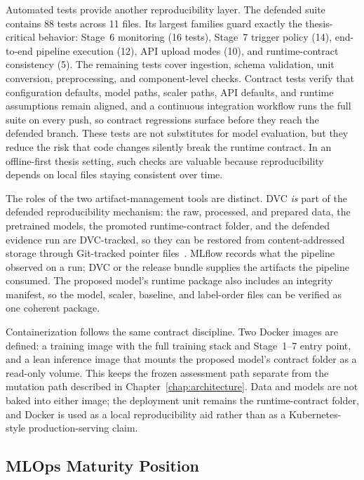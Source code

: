 Automated tests provide another reproducibility layer. The defended suite contains 88 tests across 11 files. Its largest families guard exactly the thesis-critical behavior: Stage~6 monitoring (16 tests), Stage~7 trigger policy (14), end-to-end pipeline execution (12), API upload modes (10), and runtime-contract consistency (5). The remaining tests cover ingestion, schema validation, unit conversion, preprocessing, and component-level checks. Contract tests verify that configuration defaults, model paths, scaler paths, API defaults, and runtime assumptions remain aligned, and a continuous integration workflow runs the full suite on every push, so contract regressions surface before they reach the defended branch. These tests are not substitutes for model evaluation, but they reduce the risk that code changes silently break the runtime contract. In an offline-first thesis setting, such checks are valuable because reproducibility depends on local files staying consistent over time.

The roles of the two artifact-management tools are distinct. DVC \emph{is} part of the defended reproducibility mechanism: the raw, processed, and prepared data, the pretrained models, the promoted runtime-contract folder, and the defended evidence run are DVC-tracked, so they can be restored from content-addressed storage through Git-tracked pointer files~\cite{kuprieiev2023dvc}. MLflow records what the pipeline observed on a run; DVC or the release bundle supplies the artifacts the pipeline consumed. The proposed model's runtime package also includes an integrity manifest, so the model, scaler, baseline, and label-order files can be verified as one coherent package.

Containerization follows the same contract discipline. Two Docker images are defined: a training image with the full training stack and Stage~1--7 entry point, and a lean inference image that mounts the proposed model's contract folder as a read-only volume. This keeps the frozen assessment path separate from the mutation path described in Chapter~\ref{chap:architecture}. Data and models are not baked into either image; the deployment unit remains the runtime-contract folder, and Docker is used as a local reproducibility aid rather than as a Kubernetes-style production-serving claim.

\subsection{MLOps Maturity Position}
\label{sec:mlops_maturity_position}

